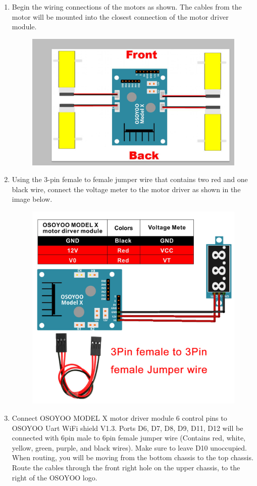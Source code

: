 \documentclass{article}
\begin{document}
\begin{enumerate}
		\item Begin the wiring connections of the motors as shown. The cables from the motor will be mounted into the closest connection of the motor driver module.
		
		\begin{figure}[H]
			\centering
			\includegraphics[width=0.7\linewidth]{image9}
			\label{fig:image9}
		\end{figure}
		
		\item Using the 3-pin female to female jumper wire that contains two red and one black wire, connect the voltage meter to the motor driver as shown in the image below.
		
		\begin{figure}[H]
			\centering
			\includegraphics[width=0.7\linewidth]{image10}
			\label{fig:image10}
		\end{figure}
		
		\item Connect OSOYOO MODEL X motor driver module 6 control pins to OSOYOO Uart WiFi shield V1.3. Ports D6, D7, D8, D9, D11, D12 will be connected with 6pin male to 6pin female jumper wire (Contains red, white, yellow, green, purple, and black wires). Make sure to leave D10 unoccupied. When routing, you will be moving from the bottom chassis to the top chassis. Route the cables through the front right hole on the upper chassis, to the right of the OSOYOO logo.
		

\end{enumerate}
\end{document}
